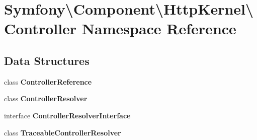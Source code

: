 \section{Symfony\textbackslash{}Component\textbackslash{}Http\+Kernel\textbackslash{}Controller Namespace Reference}
\label{namespace_symfony_1_1_component_1_1_http_kernel_1_1_controller}
\subsection*{Data Structures}
\begin{DoxyCompactItemize}
\item 
class {\bf Controller\+Reference}
\item 
class {\bf Controller\+Resolver}
\item 
interface {\bf Controller\+Resolver\+Interface}
\item 
class {\bf Traceable\+Controller\+Resolver}
\end{DoxyCompactItemize}
